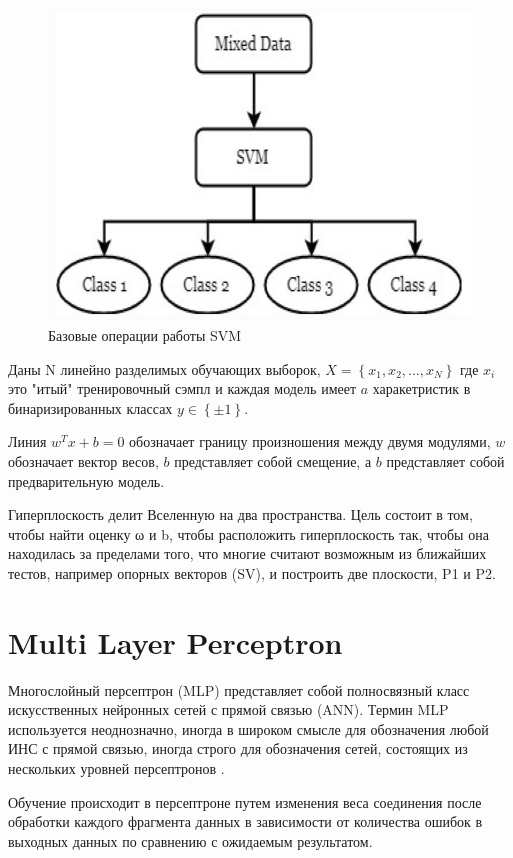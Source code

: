 \begin{figure}[h]
\includegraphics[width=0.75\columnwidth]{./img/svm_diagramma.jpg}
\centering
\caption{Базовые операции работы SVM}
\label{pic:svm_diagramma}
\end{figure}

Даны N линейно разделимых обучающих выборок, $X = \left \{ x_1, x_2, ..., x_N \right \}$ 
где $x_i$ это "итый" тренировочный сэмпл и каждая модель имеет $a$ харакетристик в 
бинаризированных классах $y \in \left \{ \pm 1 \right \}$. 

Линия $w^T x + b = 0$ обозначает границу произношения между двумя модулями, 
$w$ обозначает вектор весов, $b$ представляет собой смещение, 
а $b$ представляет собой предварительную модель.

Гиперплоскость делит Вселенную на два пространства. 
Цель состоит в том, чтобы найти оценку ω и b, 
чтобы расположить гиперплоскость так, чтобы она находилась 
за пределами того, что многие считают возможным из ближайших тестов, 
например опорных векторов (SV), и построить две плоскости, P1 и P2.

\section{Multi Layer Perceptron}
Многослойный персептрон (MLP) представляет собой полносвязный класс искусственных нейронных сетей с прямой связью (ANN). 
Термин MLP используется неоднозначно, иногда в широком смысле для обозначения любой ИНС с прямой связью, иногда 
строго для обозначения сетей, состоящих из нескольких уровней персептронов \cite{wiki_mlp}.

Обучение происходит в персептроне путем изменения веса соединения после обработки каждого фрагмента
данных в зависимости от количества ошибок в выходных данных по сравнению с ожидаемым результатом.

